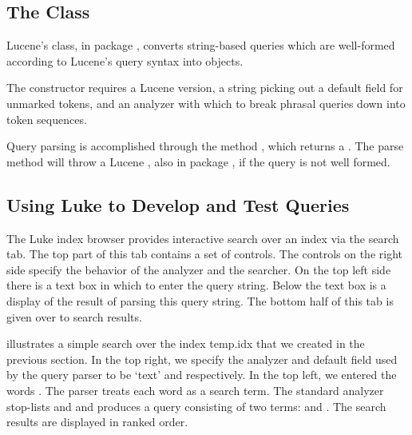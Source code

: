 \subsection{The  Class}

Lucene's  class, in package
, converts string-based queries
which are well-formed according to Lucene's query syntax into  objects.  

The constructor  requires a
Lucene version, a string picking out a default field for unmarked
tokens, and an analyzer with which to break phrasal queries down into
token sequences.  

Query parsing is accomplished through the method ,
which returns a .  The parse method will throw a
Lucene , also in package , if
the query is not well formed.

\subsection{Using Luke to Develop and Test Queries}

The Luke index browser provides interactive search over an index
via the search tab.
The top part of this tab contains a set of controls.  The controls
on the right side specify the behavior of the analyzer and the searcher.
On the top left side there is a text box in which to enter the query string.
Below the text box is a display of the result of parsing this query string.
The bottom half of this tab is given over to search results.

 illustrates a simple search over the index temp.idx that we created in the previous section.
In the top right, we specify the analyzer and default field used by the query parser to be `text' and 
 respectively.
In the top left, we entered the words .
The parser treats each word as a search term.  The standard analyzer stop-lists
 and  and produces a query consisting of two terms:
 and .
The search results are displayed in ranked order.

